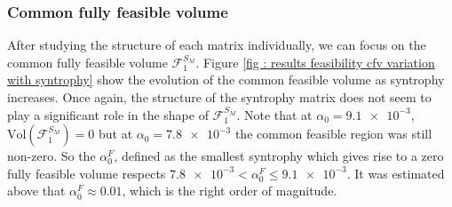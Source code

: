 \documentclass[12pt, titlepage]{report}
\begin{document}
  \subsubsection{Common fully feasible volume}
 After studying the structure of each matrix individually, we can focus on the common fully feasible volume $\mathcal{F}_1^{S_M}$. Figure \ref{fig : results feasibility cfv variation with syntrophy} show the evolution of the common feasible volume as syntrophy increases. Once again, the structure of the syntrophy matrix does not seem to play a significant role in the shape of $\mathcal{F}_1^{S_M}$. Note that at $\alpha_0=\num{9.1e-3}$, $\text{Vol}\left(\mathcal{F}_1^{S_M}\right)=0$ but at $\alpha_0=\num{7.8e-3}$ the common feasible region was still non-zero. So the  $\alpha_0^F$, defined as the smallest syntrophy which gives rise to a zero fully feasible volume respects $\num{7.8e-3} < \alpha_0^F \leq \num{9.1e-3}$. It was estimated above that $\alpha_0^F \approx 0.01$, which is the right order of magnitude.
\end{document}

